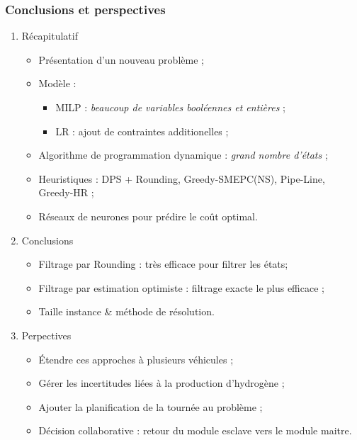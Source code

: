 \documentclass[hyperref={bookmarks=false},aspectratio=169]{beamer}
\begin{document}
\begin{frame}
\frametitle{Conclusions et perspectives}

\begin{enumerate}
\item<1-> Récapitulatif
\begin{itemize}

\item Présentation d'un nouveau problème ;%


\item Modèle :
\begin{itemize}
\item MILP : \textit{beaucoup de variables booléennes et entières} ;%
\space
\item LR : ajout de contraintes additionelles ;
\end{itemize}
\item Algorithme de programmation dynamique : \textit{grand nombre d'états} ;
\item Heuristiques : DPS + Rounding, Greedy-SMEPC(NS), Pipe-Line, Greedy-HR ;
\item Réseaux de neurones pour prédire le coût optimal.
\end{itemize}
\item<2-> Conclusions
\begin{itemize}
\item  Filtrage par Rounding : très efficace pour filtrer les états;
\item Filtrage par estimation optimiste : filtrage exacte le plus efficace ;
\item Taille instance \& méthode de résolution.
\end{itemize}
\item<3-> Perpectives
\begin{itemize}
\item \'{E}tendre ces approches à plusieurs véhicules ;
\item Gérer les incertitudes liées à la production d'hydrogène ;
\item Ajouter la planification de la tournée au problème ;
\item Décision collaborative : retour du module esclave vers le module maitre.
\end{itemize}
\end{enumerate}



\end{frame}
\end{document}
